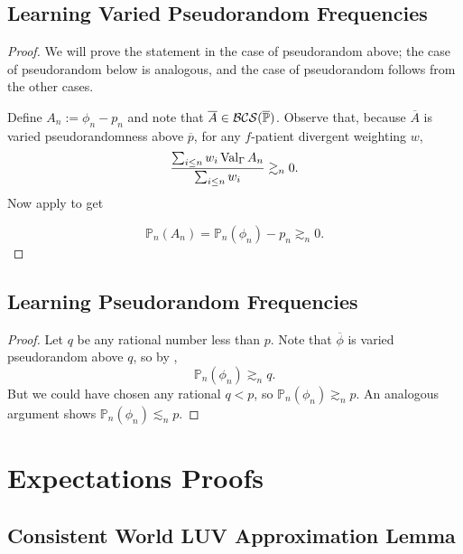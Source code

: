 \documentclass[authordate,onecolumn,noenvironments]{miri-tech-article}
\numberwithin{equation}{subsection}
\newcommand{\seq}[1]{{\overline{#1}}}
\newcommand{\fuz}{w}
\newcommand{\deff}{f}
\newcommand{\phis}{\seq{\phi}}
\newcommand{\aff}{A}
\newcommand{\BCS}[1][\MP]{\mathcal{B\-C\-S}(#1)} %
\newcommand{\BelState}{\mathbb{P}}
\newcommand{\pt}{\BelState}
\newcommand{\MP}{\seq{\pt}}
\newcommand{\Theory}{\Gamma}
\newcommand{\thmval}[1][\Theory]{\operatorname{Val}_{#1}\-} %
\begin{document}
\subsection{Learning Varied Pseudorandom Frequencies}\label{app:seqprand}\label{app:prand}

\seqprand*

\prand*

\begin{proof}

  We will prove the statement in the case of pseudorandom above; the case of pseudorandom below is analogous, and the case of pseudorandom follows from the other cases.  

  Define $\aff_n := \phi_n - p_n$ and note that $\seq\aff \in \BCS$.  Observe that, because $\seq \aff$ is varied pseudorandomness above $\seq p$, for any $\deff$-patient divergent weighting $\fuz$,
  \[ 
    \frac{\sum_{i \leq n} \fuz_i \thmval{\aff_n}}{\sum_{i \leq n} \fuz_i} \gtrsim_n 0.
  \]
  Now apply  to get

  \[ \pt_n(\aff_n) = \pt_n(\phi_n) - p_n \gtrsim_n 0. \]

\end{proof}

\subsection{Learning Pseudorandom Frequencies}\label{app:pseudorandom}\label{app:benford}

\pseudorandom*

\benford*

\begin{proof}
  Let $q$ be any rational number less than $p$.  Note that $\phis$ is varied pseudorandom above $q$, so by ,
  \[ \pt_n(\phi_n) \gtrsim_n q. \]
  But we could have chosen any rational $q < p$, so $\pt_n(\phi_n) \gtrsim_n p$.  An analogous argument shows $\pt_n(\phi_n) \lesssim_n p$.
\end{proof}

\section{Expectations Proofs}\label{app:expectationsproofs}

\subsection{Consistent World LUV Approximation Lemma}\label{app:conluvapprox}
\end{document}
